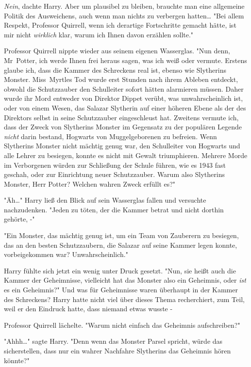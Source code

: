{\emph{Nein}, dachte Harry. Aber um plausibel zu bleiben, brauchte man eine allgemeine Politik des Ausweichens, auch wenn man nichts zu verbergen hatten… "Bei allem Respekt, Professor Quirrell, wenn ich derartige Fortschritte gemacht hätte, ist mir nicht \emph{wirklich} klar, warum ich Ihnen davon erzählen sollte."

Professor Quirrell nippte wieder aus seinem eigenen Wasserglas. "Nun denn, Mr~Potter, ich werde Ihnen frei heraus sagen, was ich weiß oder vermute. Erstens glaube ich, dass die Kammer des Schreckens real ist, ebenso wie Slytherins Monster. Miss~Myrtles Tod wurde erst Stunden nach ihrem Ableben entdeckt, obwohl die Schutzzauber den Schulleiter sofort hätten alarmieren müssen. Daher wurde ihr Mord entweder von Direktor Dippet verübt, was unwahrscheinlich ist, oder von einem Wesen, das Salazar Slytherin auf einer höheren Ebene als der des Direktors selbst in seine Schutzzauber eingeschleust hat. Zweitens vermute ich, dass der Zweck von Slytherins Monster im Gegensatz zu der populären Legende \emph{nicht} darin bestand, Hogwarts von Muggelgeborenen zu befreien. Wenn Slytherins Monster nicht mächtig genug war, den Schulleiter von Hogwarts und alle Lehrer zu besiegen, konnte es nicht mit Gewalt triumphieren. Mehrere Morde im Verborgenen würden zur Schließung der Schule führen, wie es 1943 fast geschah, oder zur Einrichtung neuer Schutzzauber. Warum also Slytherins Monster, Herr Potter? Welchen wahren Zweck erfüllt es?"

"Äh…" Harry ließ den Blick auf sein Wasserglas fallen und versuchte nachzudenken. "Jeden zu töten, der die Kammer betrat und nicht dorthin gehörte, -"

"Ein Monster, das mächtig genug ist, um ein Team von Zauberern zu besiegen, das an den besten Schutzzaubern, die Salazar auf seine Kammer legen konnte, vorbeigekommen war? Unwahrscheinlich."

Harry fühlte sich jetzt ein wenig unter Druck gesetzt. "Nun, sie heißt auch die Kammer der Geheimnisse, vielleicht hat das Monster also ein Geheimnis, oder \emph{ist} es ein Geheimnis?" Und was für Geheimnisse waren überhaupt in der Kammer des Schreckens? Harry hatte nicht viel über dieses Thema recherchiert, zum Teil, weil er den Eindruck hatte, dass niemand etwas wusste -

Professor Quirrell lächelte. "Warum nicht einfach das Geheimnis aufschreiben?"

"Ahhh…" sagte Harry. "Denn wenn das Monster Parsel spricht, würde das sicherstellen, dass nur ein wahrer Nachfahre Slytherins das Geheimnis hören könnte?"

}
